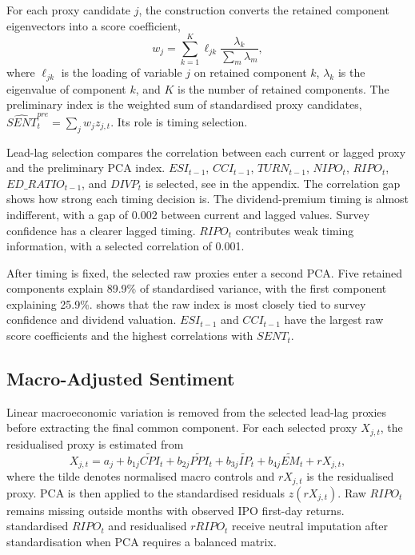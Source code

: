 \documentclass[11pt]{article}
\newcommand{\var}[1]{\ensuremath{#1}}
\begin{document}
For each proxy candidate \(j\), the construction converts the retained component eigenvectors into a score coefficient,
\begin{equation}
    w_j = \sum_{k=1}^{K} \ell_{jk}\frac{\lambda_k}{\sum_m \lambda_m},
\end{equation}
where \(\ell_{jk}\) is the loading of variable \(j\) on retained component \(k\), \(\lambda_k\) is the eigenvalue of component \(k\), and \(K\) is the number of retained components. The preliminary index is the weighted sum of standardised proxy candidates, \(\widehat{SENT}^{pre}_t=\sum_j w_j z_{j,t}\). Its role is timing selection.

Lead-lag selection compares the correlation between each current or lagged proxy and the preliminary PCA index. \var{ESI_{t-1}}, \var{CCI_{t-1}}, \var{TURN_{t-1}}, \var{NIPO_t}, \var{RIPO_t}, \var{ED\_RATIO_{t-1}}, and \var{DIVP_t} is selected, see  in the appendix. The correlation gap shows how strong each timing decision is. The dividend-premium timing is almost indifferent, with a gap of 0.002 between current and lagged values. Survey confidence has a clearer lagged timing. \var{RIPO_t} contributes weak timing information, with a selected correlation of 0.001.

After timing is fixed, the selected raw proxies enter a second PCA. Five retained components explain 89.9\% of standardised variance, with the first component explaining 25.9\%.  shows that the raw index is most closely tied to survey confidence and dividend valuation. \var{ESI_{t-1}} and \var{CCI_{t-1}} have the largest raw score coefficients and the highest correlations with \var{SENT_t}.

\subsection{Macro-Adjusted Sentiment}
Linear macroeconomic variation is removed from the selected lead-lag proxies before extracting the final common component. For each selected proxy \(X_{j,t}\), the residualised proxy is estimated from
\begin{equation}
    X_{j,t}
    =
    a_j
    + b_{1j}\widetilde{CPI}_t
    + b_{2j}\widetilde{PPI}_t
    + b_{3j}\widetilde{IP}_t
    + b_{4j}\widetilde{EM}_t
    + rX_{j,t},
\end{equation}
where the tilde denotes normalised macro controls and \(rX_{j,t}\) is the residualised proxy. PCA is then applied to the standardised residuals \(z(rX_{j,t})\). Raw \var{RIPO_t} remains missing outside months with observed IPO first-day returns. standardised \var{RIPO_t} and residualised \var{rRIPO_t} receive neutral imputation after standardisation when PCA requires a balanced matrix.
\end{document}
